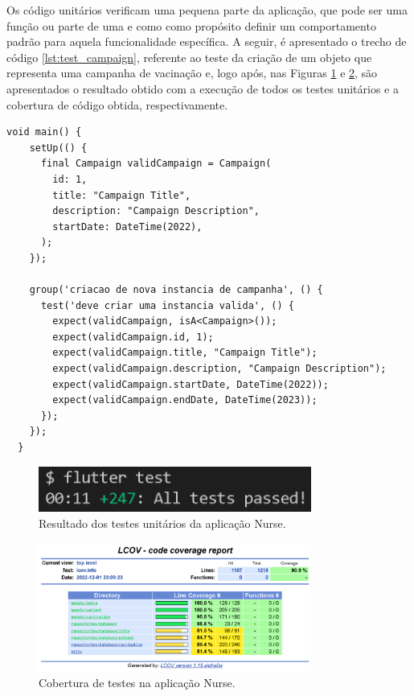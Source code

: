 Os código unitários \cite{flutter-testing} \cite{martin2011codigo} verificam uma pequena parte da aplicação, que pode ser uma função ou parte de uma e como como propósito definir um comportamento padrão para aquela funcionalidade específica. A seguir, é apresentado o trecho de código \ref{lst:test_campaign}, referente ao teste da criação de um objeto que representa uma campanha de vacinação e, logo após, nas Figuras \ref{fig:tests_result} e \ref{fig:tests_coverage}, são apresentados o resultado obtido com a execução de todos os testes unitários e a cobertura de código obtida, respectivamente.

\begin{lstlisting}[caption={Teste unitário para verificação da correta criação de uma instância de \textbf{\textit{Campaign}}}, label={lst:test_campaign}]
  void main() {  
    setUp(() {
      final Campaign validCampaign = Campaign(
        id: 1,
        title: "Campaign Title",
        description: "Campaign Description",
        startDate: DateTime(2022),
      );
    });
  
    group('criacao de nova instancia de campanha', () {
      test('deve criar uma instancia valida', () {
        expect(validCampaign, isA<Campaign>());
        expect(validCampaign.id, 1);
        expect(validCampaign.title, "Campaign Title");
        expect(validCampaign.description, "Campaign Description");
        expect(validCampaign.startDate, DateTime(2022));
        expect(validCampaign.endDate, DateTime(2023));
      });
    });
  }
\end{lstlisting}

\begin{figure}[!ht]
  \centering
  \includegraphics[width=0.8\textwidth]{figuras/cap5/5_tests_result.png}
  \caption{Resultado dos testes unitários da aplicação Nurse.}
  \label{fig:tests_result}
\end{figure}

\begin{figure}[!ht]
  \centering
  \includegraphics[width=0.8\textwidth]{figuras/cap5/5_coverage_report.png}
  \caption{Cobertura de testes na aplicação Nurse.}
  \label{fig:tests_coverage}
\end{figure}

